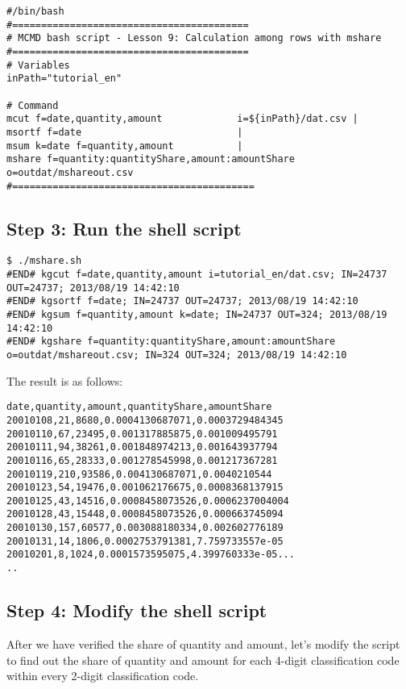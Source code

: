 \begin{verbatim}
#/bin/bash
#=========================================
# MCMD bash script - Lesson 9: Calculation among rows with mshare
#=========================================
# Variables
inPath="tutorial_en"

# Command 
mcut f=date,quantity,amount             i=${inPath}/dat.csv |
msortf f=date                           |
msum k=date f=quantity,amount           |
mshare f=quantity:quantityShare,amount:amountShare o=outdat/mshareout.csv
#==========================================
\end{verbatim}

\subsection{Step 3: Run the shell script }

\begin{verbatim}
$ ./mshare.sh 
#END# kgcut f=date,quantity,amount i=tutorial_en/dat.csv; IN=24737 OUT=24737; 2013/08/19 14:42:10
#END# kgsortf f=date; IN=24737 OUT=24737; 2013/08/19 14:42:10
#END# kgsum f=quantity,amount k=date; IN=24737 OUT=324; 2013/08/19 14:42:10
#END# kgshare f=quantity:quantityShare,amount:amountShare o=outdat/mshareout.csv; IN=324 OUT=324; 2013/08/19 14:42:10
\end{verbatim}

\noindent
The result is as follows: 

\begin{verbatim}
date,quantity,amount,quantityShare,amountShare
20010108,21,8680,0.0004130687071,0.0003729484345
20010110,67,23495,0.001317885875,0.001009495791
20010111,94,38261,0.001848974213,0.001643937794
20010116,65,28333,0.001278545998,0.001217367281
20010119,210,93586,0.004130687071,0.0040210544
20010123,54,19476,0.001062176675,0.0008368137915
20010125,43,14516,0.0008458073526,0.0006237004004
20010128,43,15448,0.0008458073526,0.000663745094
20010130,157,60577,0.003088180334,0.002602776189
20010131,14,1806,0.0002753791381,7.759733557e-05
20010201,8,1024,0.0001573595075,4.399760333e-05...
..
\end{verbatim}

\subsection{Step 4: Modify the shell script }

After we have verified the share of quantity and amount, let's modify the script to find out the share of quantity and amount for each 4-digit classification code within every 2-digit classification code. \\

